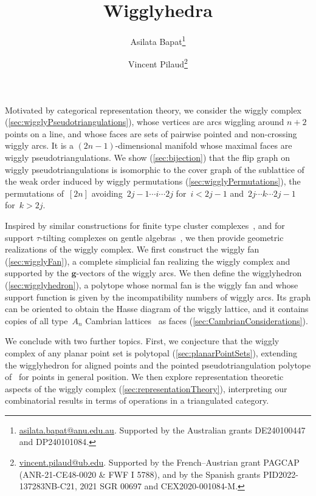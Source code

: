 \documentclass[submission]{FPSAC2025}
\title{Wigglyhedra}
\author{Asilata Bapat\thanks{\href{mailto:asilata.bapat@anu.edu.au}{asilata.bapat@anu.edu.au}. Supported by the Australian grants DE240100447 and DP240101084.}\addressmark{1} \and Vincent Pilaud\thanks{\href{mailto:vincent.pilaud@ub.edu}{vincent.pilaud@ub.edu}. Supported by the French--Austrian grant PAGCAP (ANR-21-CE48-0020 \& FWF I 5788), and by the Spanish grants PID2022-137283NB-C21, 2021 SGR 00697 and CEX2020-001084-M.}\addressmark{2}}
\theoremstyle{definition}
\renewcommand{\b}[1]{{\boldsymbol{#1}}} %
\begin{document}

\maketitle

Motivated by categorical representation theory, we consider the wiggly complex (\cref{sec:wigglyPseudotriangulations}), whose vertices are arcs wiggling around $n+2$ points on a line, and whose faces are sets of pairwise pointed and non-crossing wiggly arcs.
It is a $(2n-1)$-dimensional manifold whose maximal faces are wiggly pseudotriangulations.
We show (\cref{sec:bijection}) that the flip graph on wiggly pseudotriangulations is isomorphic to the cover graph of the sublattice of the weak order induced by wiggly permutations (\cref{sec:wigglyPermutations}), the permutations of~$[2n]$ avoiding~$2j-1 \cdots i \cdots 2j$ for~$i < 2j-1$ and~$2j \cdots k \cdots 2j-1$ for~$k > 2j$.

Inspired by similar constructions for finite type cluster complexes~\cite{HohlwegLangeThomas,HohlwegPilaudStella}, and for support $\tau$-tilting complexes on gentle algebras~\cite{PaluPilaudPlamondon-nonkissing}, we then provide geometric realizations of the wiggly complex.
We first construct the wiggly fan (\cref{sec:wigglyFan}), a complete simplicial fan realizing the wiggly complex and supported by the $\b{g}$-vectors of the wiggly arcs.
We then define the wigglyhedron (\cref{sec:wigglyhedron}), a polytope whose normal fan is the wiggly fan and whose support function is given by the incompatibility numbers of wiggly arcs.
Its graph can be oriented to obtain the Hasse diagram of the wiggly lattice, and it contains copies of all type~$A_n$ Cambrian lattices~\cite{Reading-CambrianLattices} as faces (\cref{sec:CambrianConsiderations}).

We conclude with two further topics.
First, we conjecture that the wiggly complex of any planar point set is polytopal (\cref{sec:planarPointSets}), extending the wigglyhedron for aligned points and the pointed pseudotriangulation polytope of~\cite{RoteSantosStreinu-polytope} for points in general position.
We then explore representation theoretic aspects of the wiggly complex (\cref{sec:representationTheory}), interpreting our combinatorial results in terms of operations in a triangulated category.
\end{document}
